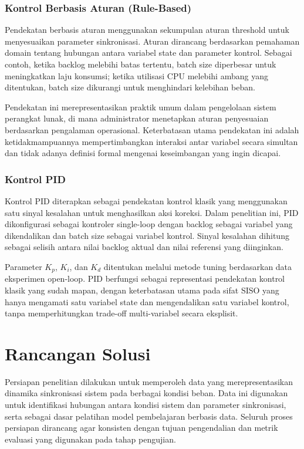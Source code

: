\subsubsection{Kontrol Berbasis Aturan (Rule-Based)}

Pendekatan berbasis aturan menggunakan sekumpulan aturan threshold untuk menyesuaikan parameter sinkronisasi.
Aturan dirancang berdasarkan pemahaman domain tentang hubungan antara variabel state dan parameter kontrol.
Sebagai contoh, ketika backlog melebihi batas tertentu, batch size diperbesar untuk meningkatkan laju konsumsi; ketika utilisasi CPU melebihi ambang yang ditentukan, batch size dikurangi untuk menghindari kelebihan beban.

Pendekatan ini merepresentasikan praktik umum dalam pengelolaan sistem perangkat lunak, di mana administrator menetapkan aturan penyesuaian berdasarkan pengalaman operasional.
Keterbatasan utama pendekatan ini adalah ketidakmampuannya mempertimbangkan interaksi antar variabel secara simultan dan tidak adanya definisi formal mengenai keseimbangan yang ingin dicapai.

\subsubsection{Kontrol PID}

Kontrol PID diterapkan sebagai pendekatan kontrol klasik yang menggunakan satu sinyal kesalahan untuk menghasilkan aksi koreksi.
Dalam penelitian ini, PID dikonfigurasi sebagai kontroler single-loop dengan backlog sebagai variabel yang dikendalikan dan batch size sebagai variabel kontrol.
Sinyal kesalahan dihitung sebagai selisih antara nilai backlog aktual dan nilai referensi yang diinginkan.

Parameter $K_p$, $K_i$, dan $K_d$ ditentukan melalui metode tuning berdasarkan data eksperimen open-loop.
PID berfungsi sebagai representasi pendekatan kontrol klasik yang sudah mapan, dengan keterbatasan utama pada sifat SISO yang hanya mengamati satu variabel state dan mengendalikan satu variabel kontrol, tanpa memperhitungkan trade-off multi-variabel secara eksplisit.

\section{Rancangan Solusi}

Persiapan penelitian dilakukan untuk memperoleh data yang merepresentasikan dinamika sinkronisasi sistem pada berbagai kondisi beban.
Data ini digunakan untuk identifikasi hubungan antara kondisi sistem dan parameter sinkronisasi, serta sebagai dasar pelatihan model pembelajaran berbasis data.
Seluruh proses persiapan dirancang agar konsisten dengan tujuan pengendalian dan metrik evaluasi yang digunakan pada tahap pengujian.

